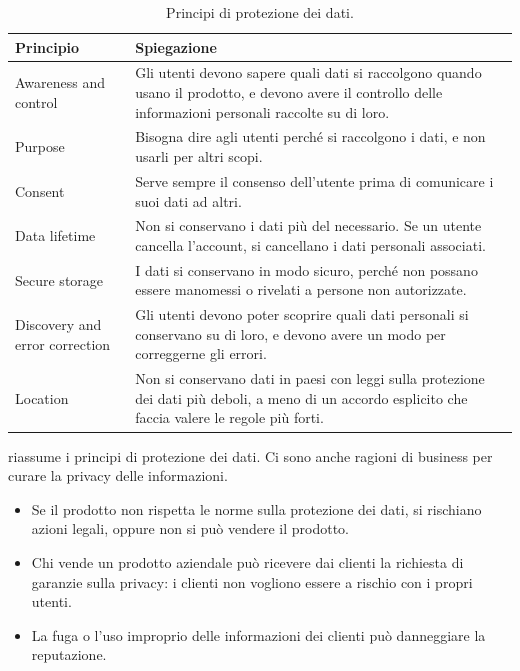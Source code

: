 \begin{table}[ht]
\centering
\small
\caption{Principi di protezione dei dati.}
\label{tab:sic-principi}
\begin{tabularx}{\linewidth}{>{\raggedright\arraybackslash}p{3.6cm}X}
\toprule
Principio & Spiegazione \\
\midrule
Awareness and control & Gli utenti devono sapere quali dati si raccolgono quando usano il prodotto, e devono avere
  il controllo delle informazioni personali raccolte su di loro. \\
Purpose & Bisogna dire agli utenti perché si raccolgono i dati, e non usarli per altri scopi. \\
Consent & Serve sempre il consenso dell'utente prima di comunicare i suoi dati ad altri. \\
Data lifetime & Non si conservano i dati più del necessario. Se un utente cancella l'account, si cancellano i dati
  personali associati. \\
Secure storage & I dati si conservano in modo sicuro, perché non possano essere manomessi o rivelati a persone non
  autorizzate. \\
Discovery and error correction & Gli utenti devono poter scoprire quali dati personali si conservano su di loro, e
  devono avere un modo per correggerne gli errori. \\
Location & Non si conservano dati in paesi con leggi sulla protezione dei dati più deboli, a meno di un accordo
  esplicito che faccia valere le regole più forti. \\
\bottomrule
\end{tabularx}
\end{table}

 riassume i principi di protezione dei dati. Ci sono anche ragioni di business per curare la
privacy delle informazioni.
\begin{itemize}
  \item Se il prodotto non rispetta le norme sulla protezione dei dati, si rischiano azioni legali, oppure non si può
    vendere il prodotto.
  \item Chi vende un prodotto aziendale può ricevere dai clienti la richiesta di garanzie sulla privacy: i clienti non
    vogliono essere a rischio con i propri utenti.
  \item La fuga o l'uso improprio delle informazioni dei clienti può danneggiare la reputazione.
\end{itemize}

